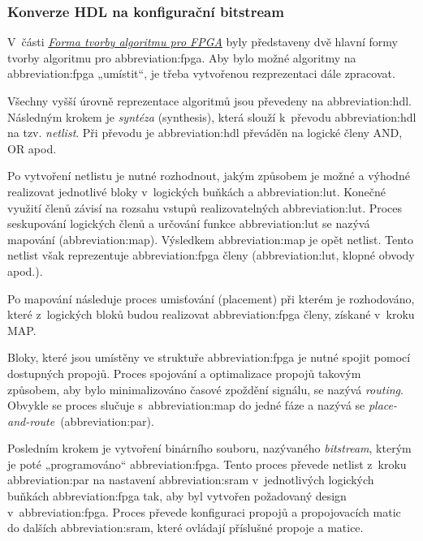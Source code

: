 \documentclass[a4paper, twoside, 11pt]{article}
\begin{document}
		\subsubsection{Konverze HDL na konfigurační bitstream}
			V~části \hyperref[subsubsec:forma-tvorby-algoritmu-pro-fpga]{\textit{Forma tvorby algoritmu pro FPGA}} byly představeny dvě hlavní formy tvorby algoritmu pro \gls{abbreviation:fpga}. Aby bylo možné algoritmy na \gls{abbreviation:fpga} „umístit“, je třeba vytvořenou rezprezentaci dále zpracovat.\par
			Všechny vyšší úrovně reprezentace algoritmů jsou převedeny na \gls{abbreviation:hdl}. Následným krokem je \textit{syntéza} (synthesis), která slouží k~převodu \gls{abbreviation:hdl} na tzv. \textit{netlist}. Při převodu je \gls{abbreviation:hdl} převáděn na logické členy AND, OR apod. \cite{Sass2010}\par
			Po vytvoření netlistu je nutné rozhodnout, jakým způsobem je možné a výhodné realizovat jednotlivé bloky v~logických buňkách a \gls{abbreviation:lut}. Konečné využití členů závisí na rozsahu vstupů realizovatelných \gls{abbreviation:lut}. Proces seskupování logických členů a určování funkce \gls{abbreviation:lut} se nazývá mapování (\gls{abbreviation:map}). Výsledkem \gls{abbreviation:map} je opět netlist. Tento netlist však reprezentuje \gls{abbreviation:fpga} členy (\gls{abbreviation:lut}, klopné obvody apod.). \cite{Sass2010}\par
			Po mapování následuje proces umisťování (placement) při kterém je rozhodováno, které z~logických bloků budou realizovat \gls{abbreviation:fpga} členy, získané v~kroku MAP. \cite{Sass2010}\par
			Bloky, které jsou umístěny ve struktuře \gls{abbreviation:fpga} je nutné spojit pomocí dostupných propojů. Proces spojování a optimalizace propojů takovým způsobem, aby bylo minimalizováno časové zpoždění signálu, se nazývá \textit{routing}. Obvykle se proces slučuje s~\gls{abbreviation:map} do jedné fáze a nazývá se \textit{place-and-route}~(\gls{abbreviation:par}). \cite{Sass2010} \par
			Posledním krokem je vytvoření binárního souboru, nazývaného \textit{bitstream}, kterým je poté „programováno“ \gls{abbreviation:fpga}. Tento proces převede netlist z~kroku \gls{abbreviation:par} na nastavení \gls{abbreviation:sram} v~jednotlivých logických buňkách \gls{abbreviation:fpga} tak, aby byl vytvořen požadovaný design v~\gls{abbreviation:fpga}. Proces převede konfiguraci propojů a propojovacích matic do dalších \gls{abbreviation:sram}, které ovládají příslušné propoje a matice. \cite{Sass2010}\par
\end{document}
